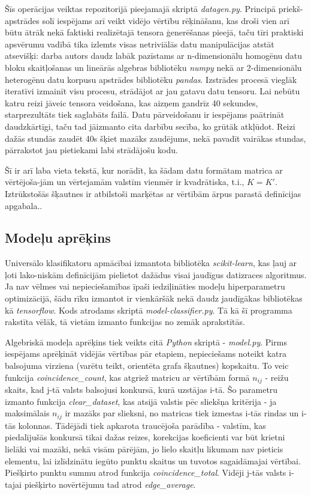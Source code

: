 \documentclass[12pt, a4paper]{article}
\numberwithin{equation}{section} %
\begin{document}
Šīs operācijas veiktas repozitorijā pieejamajā skriptā \textit{datagen.py}. Principā
priekš-apstrādes solī iespējams arī veikt vidējo vērtību rēķināšanu, kas droši vien arī būtu ātrāk nekā faktiski realizētajā tensora ģenerēšanas pieejā, taču tīri praktiski apsvērumu vadībā tika izlemts visas netriviālās datu manipulācijas atstāt atsevišķi: darba autors daudz labāk pazīstams ar n-dimensionālu homogēnu datu bloku skaitļošanas un lineārās algebras bibliotēku \textit{numpy} nekā ar 2-dimensionālu heterogēnu datu korpusu apstrādes bibliotēku \textit{pandas}. Izstrādes procesā vieglāk iteratīvi izmainīt visu procesu, strādājot ar jau gatavu datu tensoru. Lai nebūtu katru reizi jāveic tensora veidošana, kas aizņem gandrīz 40 sekundes, starprezultāts tiek saglabāts failā. Datu pārveidošanu ir iespējams paātrināt daudzkārtīgi, taču tad jāizmanto cita darbību secība, ko grūtāk atkļūdot. Reizi dažās stundās zaudēt 40s šķiet mazāks zaudējums, nekā pavadīt vairākas stundas, pārrakstot jau pietiekami labi strādājošu kodu. 

Šī ir arī laba vieta tekstā, kur norādīt, ka šādam datu formātam matrica ar vērtējoša-jām un vērtejamām valstīm vienmēr ir kvadrātiska, t.i., $K = K'$. Iztrūkstošās šķautnes ir atbilstoši marķētas ar vērtībām ārpus parastā definīcijas apgabala..

\subsection{Modeļu aprēķins}

Universālo klasifikatoru apmācībai izmantota bibliotēka \textit{scikit-learn}, kas ļauj ar ļoti lako-niskām definīcijām pielietot dažādus visai jaudīgus datizraces algoritmus. Ja nav vēlmes vai nepieciešamības īpaši iedziļināties modeļu hiperparametru optimizācijā, šādu rīku izmantot ir vienkāršāk nekā daudz jaudīgākas bibliotēkas kā \textit{tensorflow}. Kods atrodams skriptā \textit{model-classifier.py}. Tā kā šī programma rakstīta vēlāk, tā vietām izmanto funkcijas no zemāk aprakstītās.


Algebriskā modeļa aprēķins tiek veikts citā \textit{Python} skriptā - \textit{model.py}. Pirms iespējams aprēķināt vidējās vērtības pār etapiem, nepieciešams noteikt katra balsojuma virziena (varētu teikt, orientēta grafa šķautnes) kopskaitu. To veic funkcija \textit{coincidence\_count}, kas atgriež matricu ar vērtībām formā $n_{ij}$ - reižu skaits, kad j-tā valsts balsojusi konkursā, kurā uzstājas i-tā. Šo parametru izmanto funkcija \textit{clear\_dataset}, kas atsijā valstis pēc sliekšņa kritērija - ja maksimālais $n_{ij}$ ir mazāks par slieksni, no matricas tiek izmestas i-tās rindas un i-tās kolonnas. Tādējādi tiek apkarota traucējoša parādība - valstīm, kas piedalījušās konkursā tikai dažas reizes, korekcijas koeficienti var būt krietni lielāki vai mazāki, nekā visām pārējām, jo lielo skaitļu likumam nav pieticis elementu, lai izlīdzinātu iegūto punktu skaitus un tuvotos sagaidāmajai vērtībai. Piešķirto punktu summu atrod funkcija \textit{coincidence\_total}. Vidēji j-tās valsts i-tajai piešķirto novērtējumu tad atrod \textit{edge\_average}. 
\end{document}
